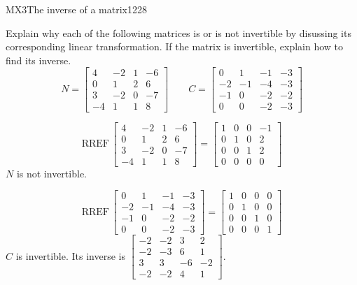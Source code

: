 \begin{exercise}{MX3}{The inverse of a matrix}{1228} 
\begin{exerciseStatement} 

 Explain why each of the following matrices is or is not invertible by disussing its corresponding linear transformation. If the matrix is invertible, explain how to find its inverse. \[
\hspace{2em}
N = \left[\begin{array}{cccc}
4 & -2 & 1 & -6 \\
0 & 1 & 2 & 6 \\
3 & -2 & 0 & -7 \\
-4 & 1 & 1 & 8
\end{array}\right]
\hspace{2em}
C = \left[\begin{array}{cccc}
0 & 1 & -1 & -3 \\
-2 & -1 & -4 & -3 \\
-1 & 0 & -2 & -2 \\
0 & 0 & -2 & -3
\end{array}\right]
\hspace{2em}
        \] 

 \end{exerciseStatement}
 \begin{exerciseAnswer} 

 \[\mathrm{RREF}\,\left[\begin{array}{cccc}
4 & -2 & 1 & -6 \\
0 & 1 & 2 & 6 \\
3 & -2 & 0 & -7 \\
-4 & 1 & 1 & 8
\end{array}\right]=\left[\begin{array}{cccc}
1 & 0 & 0 & -1 \\
0 & 1 & 0 & 2 \\
0 & 0 & 1 & 2 \\
0 & 0 & 0 & 0
\end{array}\right]\] \(N\) is not invertible. 

 

 \[\mathrm{RREF}\,\left[\begin{array}{cccc}
0 & 1 & -1 & -3 \\
-2 & -1 & -4 & -3 \\
-1 & 0 & -2 & -2 \\
0 & 0 & -2 & -3
\end{array}\right]=\left[\begin{array}{cccc}
1 & 0 & 0 & 0 \\
0 & 1 & 0 & 0 \\
0 & 0 & 1 & 0 \\
0 & 0 & 0 & 1
\end{array}\right]\] \(C\) is invertible. Its inverse is \(\left[\begin{array}{cccc}
-2 & -2 & 3 & 2 \\
-2 & -3 & 6 & 1 \\
3 & 3 & -6 & -2 \\
-2 & -2 & 4 & 1
\end{array}\right]\). 

 \end{exerciseAnswer}
 \end{exercise}


